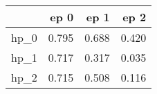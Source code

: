 \begin{tabular}{lrrr}
\toprule
{} &   ep 0 &   ep 1 &   ep 2 \\
\midrule
hp\_0 &  0.795 &  0.688 &  0.420 \\
hp\_1 &  0.717 &  0.317 &  0.035 \\
hp\_2 &  0.715 &  0.508 &  0.116 \\
\bottomrule
\end{tabular}
